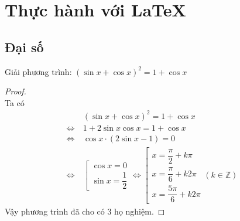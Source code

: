 \chapter{Thực hành với \LaTeX}

\section{Đại số}
\begin{dl}
	Giải phương trình: $(\sin x+\cos x)^2=1+\cos x$
\end{dl}
\begin{proof}~\\[8pt]
	Ta có 
	\begin{align*}
		&~(\sin x+\cos x)^2=1+\cos x\\
		\Leftrightarrow&~1+2\sin x\cos x=1+\cos x\\
		\Leftrightarrow&~\cos x\cdot(2\sin x-1)=0\\
		\Leftrightarrow&~\left[
			\begin{array}{l}
				\cos x=0\\[8pt]
				\sin x=\dfrac{1}{2}
				\end{array}
			\right.
		\Leftrightarrow \left[
		\begin{array}{l}
		x=\dfrac{\pi}{2}+k\pi\\[8pt]
		x=\dfrac{\pi}{6}+k2\pi\\[8pt]
		x=\dfrac{5\pi}{6}+k2\pi
		\end{array} (k\in\mathbb{Z})\right.
	\end{align*}
	Vậy phương trình đã cho có 3 họ nghiệm.
\end{proof}

